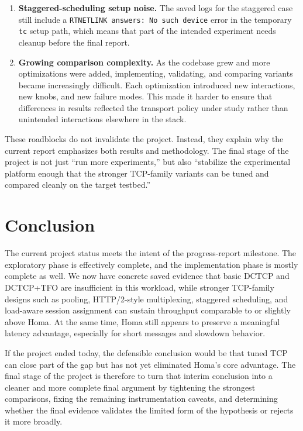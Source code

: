 \documentclass[11pt]{article}
\begin{document}
\begin{enumerate}[leftmargin=1.5em]
  \item \textbf{Staggered-scheduling setup noise.} The saved logs for the staggered case still include a \texttt{RTNETLINK answers: No such device} error in the temporary \texttt{tc} setup path, which means that part of the intended experiment needs cleanup before the final report.
  \item \textbf{Growing comparison complexity.} As the codebase grew and more optimizations were added, implementing, validating, and comparing variants became increasingly difficult. Each optimization introduced new interactions, new knobs, and new failure modes. This made it harder to ensure that differences in results reflected the transport policy under study rather than unintended interactions elsewhere in the stack.
\end{enumerate}

These roadblocks do not invalidate the project. Instead, they explain why the current report emphasizes both results and methodology. The final stage of the project is not just ``run more experiments,'' but also ``stabilize the experimental platform enough that the stronger TCP-family variants can be tuned and compared cleanly on the target testbed.''

\section{Conclusion}

The current project status meets the intent of the progress-report milestone. The exploratory phase is effectively complete, and the implementation phase is mostly complete as well. We now have concrete saved evidence that basic DCTCP and DCTCP+TFO are insufficient in this workload, while stronger TCP-family designs such as pooling, HTTP/2-style multiplexing, staggered scheduling, and load-aware session assignment can sustain throughput comparable to or slightly above Homa. At the same time, Homa still appears to preserve a meaningful latency advantage, especially for short messages and slowdown behavior.

If the project ended today, the defensible conclusion would be that tuned TCP can close part of the gap but has not yet eliminated Homa's core advantage. The final stage of the project is therefore to turn that interim conclusion into a cleaner and more complete final argument by tightening the strongest comparisons, fixing the remaining instrumentation caveats, and determining whether the final evidence validates the limited form of the hypothesis or rejects it more broadly.
\end{document}
